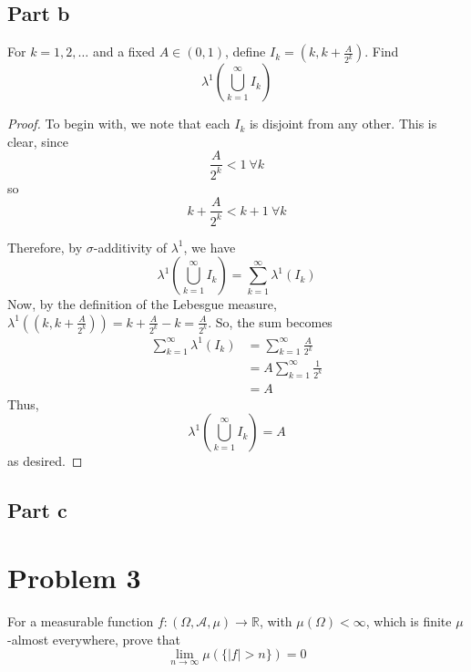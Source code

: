 \documentclass[fontsize=11pt]{scrartcl} %
\numberwithin{equation}{section} %
\numberwithin{figure}{section} %
\numberwithin{table}{section} %
\newcommand{\R}{\mathbb{R}}
\newcommand{\A}{\mathscr{A}}
\begin{document}
\subsection*{Part b}
For $k=1,2,\ldots$ and a fixed $A\in(0,1)$, define $I_k = (k,k+\frac{A}{2^k})$.
Find
\[
\lambda^1\left(\bigcup_{k=1}^{\infty}I_k\right)
\]

\begin{proof}
To begin with, we note that each $I_k$ is disjoint from any other. This is clear, since
\[
\frac{A}{2^k} < 1\ \forall k
\]
so
\[
k+\frac{A}{2^k} < k+1\ \forall k
\]

Therefore, by $\sigma$-additivity of $\lambda^1$, we have
\[
\lambda^1\left(\bigcup_{k=1}^{\infty}I_k\right) = \sum_{k=1}^{\infty}\lambda^1(I_k)
\]
Now, by the definition of the Lebesgue measure, $\lambda^1((k,k+\frac{A}{2^k})) = k+\frac{A}{2^k} - k = \frac{A}{2^k}$.
So, the sum becomes
\[
\begin{aligned}
\sum_{k=1}^{\infty}\lambda^1(I_k)   &= \sum_{k=1}^{\infty}\frac{A}{2^k}\\
                                    &= A\sum_{k=1}^{\infty}\frac{1}{2^k}\\
                                    &= A
\end{aligned}
\]
Thus, 
\[
\lambda^1\left(\bigcup_{k=1}^{\infty}I_k\right) = A
\]
as desired.
\end{proof}

\subsection*{Part c}

\section*{Problem 3}
For a measurable function $f:(\Omega,\A,\mu)\to\R$, with $\mu(\Omega)<\infty$, which
is finite $\mu$-almost everywhere, prove that
\[
\lim_{n\to\infty} \mu(\{|f|> n\}) = 0
\]
\end{document}
